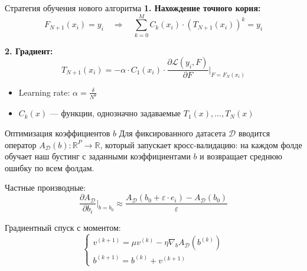 \documentclass{beamer}
\begin{document}
\begin{frame}{Стратегия обучения нового алгоритма}
    \textbf{1. Нахождение точного корня:}
    \[
        F_{N+1}(x_i) = y_i \quad \Rightarrow \quad \sum_{k=0}^M C_k(x_i) \cdot (T_{N+1}(x_i))^k = y_i
    \]

    \textbf{2. Градиент:}
    \[
        T_{N+1}(x_i) = -\alpha \cdot C_1(x_i) \cdot \frac{\partial\mathscr{L}(y_i, F)}{\partial F} \Big|_{F = F_N(x_i)}
    \]

    \begin{itemize}
        \item \footnotesize Learning rate: $\alpha = \frac{\delta}{N^\theta}$
        \item $C_k(x)$ — функции, однозначно задаваемые $T_1(x), \dots, T_N(x)$
    \end{itemize}
\end{frame}

\begin{frame}{Оптимизация коэффициентов $b$}
Для фиксированного датасета $\mathscr{D}$ вводится оператор $A_\mathscr{D} (b): \mathbb{R}^P \to \mathbb{R}$, который запускает кросс-валидацию: на каждом фолде обучает наш бустинг с заданными коэффициентами $b$ и возвращает среднюю ошибку по всем фолдам.

Частные производные:
\[
\frac{\partial A_\mathscr{D}}{\partial b_i}\Bigg|_{b=b_0}  \approx \frac{A_\mathscr{D}(b_0 + \varepsilon \cdot e_i) - A_\mathscr{D}(b_0)}{\varepsilon}
\]

Градиентный спуск с моментом:
\[
\begin{cases}
    v^{(k+1)} = \mu v^{(k)} - \eta \nabla_b A_\mathscr{D}(b^{(k)}) \\
    b^{(k+1)} = b^{(k)} + v^{(k+1)}
\end{cases}
\]

\end{frame}
\end{document}
